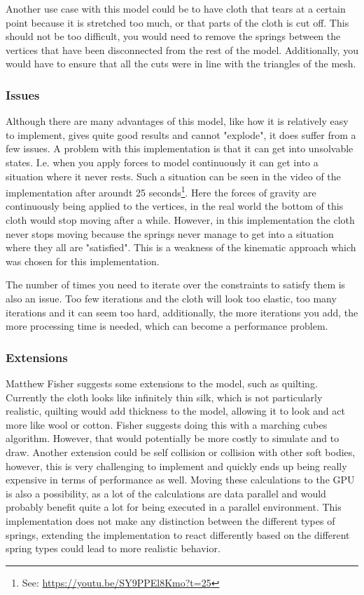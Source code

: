 Another use case with this model could be to have cloth that tears at a certain point because it is stretched too much,
or that parts of the cloth is cut off. This should not be too difficult, you would need to remove the springs between
the vertices that have been disconnected from the rest of the model.
Additionally, you would have to ensure that all the cuts were in line with the triangles of the mesh.

\subsubsection{Issues}
Although there are many advantages of this model, like how it is relatively easy to implement, gives quite good results and cannot "explode", it does suffer from a few issues.
A problem with this implementation is that it can get into unsolvable states.
I.e. when you apply forces to model continuously it can get into a situation where it never rests.
Such a situation can be seen in the video of the implementation after aroundt 25 seconds\footnote{See: \url{https://youtu.be/SY9PPEl8Kmo?t=25}}.
Here the forces of gravity are continuously being applied to the vertices, in the real world the bottom
of this cloth would stop moving after a while. However, in this implementation the cloth never stops moving
because the springs never manage to get into a situation where they all are "satisfied".
This is a weakness of the kinematic approach which was chosen for this implementation\cite{math_for_games}.

The number of times you need to iterate over the constraints to satisfy them is also an issue.
Too few iterations and the cloth will look too elastic, too many iterations and it can seem too hard,
additionally, the more iterations you add, the more processing time is needed, which can become a performance problem.

\subsubsection{Extensions}
Matthew Fisher\cite{matthew_fisher} suggests some extensions to the model,
such as quilting. Currently the cloth looks like infinitely thin silk, which is not particularly realistic,
quilting would add thickness to the model, allowing it to look and act more like wool or cotton. 
Fisher suggests doing this with a marching cubes algorithm.
However, that would potentially be more costly to simulate and to draw.
Another extension could be self collision or collision with other soft bodies, however, this is very challenging to implement
and quickly ends up being really expensive in terms of performance as well.
Moving these calculations to the GPU is also a possibility, as a lot of the calculations are data parallel and would probably benefit quite a lot for being executed in a parallel environment.
This implementation does not make any distinction between the different types of springs, extending the implementation to react differently based on the different spring types could lead to more realistic behavior.
